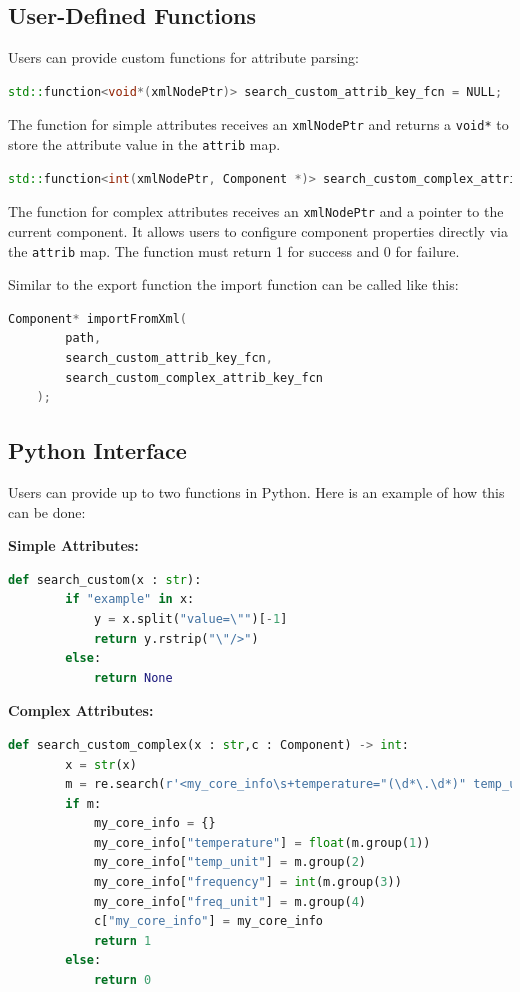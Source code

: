 \subsection{User-Defined Functions}

Users can provide custom functions for attribute parsing:

    \begin{lstlisting}[language=C++, xleftmargin=4em, frame = single]
    std::function<void*(xmlNodePtr)> search_custom_attrib_key_fcn = NULL;
    \end{lstlisting}
    The function for simple attributes receives an \verb|xmlNodePtr| and returns a \verb|void*| to store the attribute value in the \verb|attrib| map.

    \begin{lstlisting}[language=C++, xleftmargin=4em, frame = single]
    std::function<int(xmlNodePtr, Component *)> search_custom_complex_attrib_key_fcn = NULL;
    \end{lstlisting}
    The function for complex attributes receives an \verb|xmlNodePtr| and a pointer to the current component. It allows users to configure component properties directly via the \verb|attrib| map. The function must return 1 for success and 0 for failure.

    Similar to the export function the import function can be called like this:

    \begin{lstlisting}[language=C++, xleftmargin=4em, frame = single]
    Component* importFromXml(
        path, 
        search_custom_attrib_key_fcn, 
        search_custom_complex_attrib_key_fcn
    );
    \end{lstlisting}

\subsection{Python Interface}

Users can provide up to two functions in Python. Here is an example of how this can be done:

\textbf{Simple Attributes:}
    \begin{lstlisting}[language=Python, xleftmargin=4em, frame = single]
    def search_custom(x : str):
        if "example" in x:
            y = x.split("value=\"")[-1]
            return y.rstrip("\"/>")
        else:
            return None
    \end{lstlisting}

\textbf{Complex Attributes:}
    \begin{lstlisting}[language=Python, xleftmargin=4em, frame = single]
    def search_custom_complex(x : str,c : Component) -> int:
        x = str(x)
        m = re.search(r'<my_core_info\s+temperature="(\d*\.\d*)" temp_unit="(\w*)" frequency="(\d*)" freq_unit="(\w*)"/>', x)
        if m:
            my_core_info = {}
            my_core_info["temperature"] = float(m.group(1))
            my_core_info["temp_unit"] = m.group(2)
            my_core_info["frequency"] = int(m.group(3))
            my_core_info["freq_unit"] = m.group(4)
            c["my_core_info"] = my_core_info
            return 1
        else:
            return 0
    \end{lstlisting}

